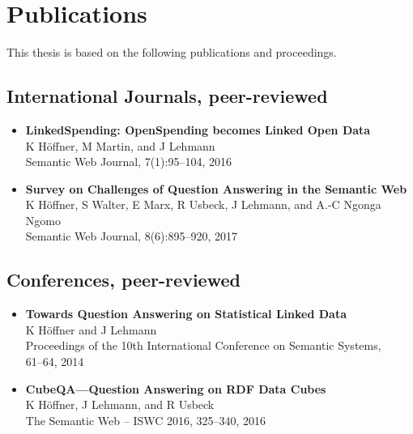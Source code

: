 \chapter*{Publications}
This thesis is based on the following publications and proceedings.
\bigskip

\section*{International Journals, peer-reviewed}
\begin{itemize}
\item \textbf{LinkedSpending: OpenSpending becomes Linked Open Data}~\citep{linkedspending}\\
K Höffner, M  Martin, and J Lehmann\\
Semantic Web Journal, 7(1):95--104, 2016
\item \textbf{Survey on Challenges of Question Answering in the Semantic Web}~\citep{qasurvey}\\
K Höffner, S Walter, E Marx, R Usbeck, J Lehmann, and A.-C Ngonga Ngomo\\
Semantic Web Journal, 8(6):895--920, 2017
\end{itemize}

\section*{Conferences, peer-reviewed}
\begin{itemize}
\item \textbf{Towards Question Answering on Statistical Linked Data}~\citep{cubeqashort}\\
K Höffner and J Lehmann\\
Proceedings of the 10th International Conference on Semantic Systems,\\61--64, 2014
\item \textbf{CubeQA---Question Answering on RDF Data Cubes}~\citep{cubeqa}\\
K Höffner, J Lehmann, and R Usbeck\\
The Semantic Web -- ISWC 2016, 325--340, 2016
\end{itemize}

